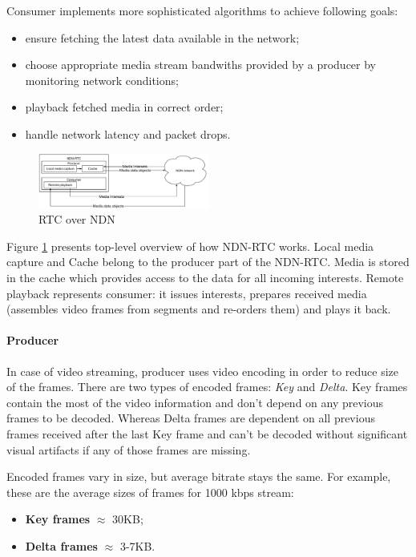 \documentclass[10pt]{proc}
\begin{document}
Consumer implements more sophisticated algorithms to achieve following goals:
\begin{itemize}
\item ensure fetching the latest data available in the network; 
\item choose appropriate media stream bandwiths provided by a producer by monitoring network conditions;
\item playback fetched media in correct order;
\item handle network latency and packet drops.
\end{itemize}

\begin{figure}[t!]
\centering
\includegraphics[width=0.5\textwidth]{architecture}
\caption{RTC over NDN}
\label{fig:arc}
\end{figure}

Figure \ref{fig:arc} presents top-level overview of how NDN-RTC works. Local media capture and Cache belong to the producer part of the NDN-RTC. Media is stored in the cache which provides access to the data for all incoming interests. Remote playback represents consumer: it issues interests, prepares received media (assembles video frames from segments and re-orders them) and plays it back.

\paragraph{Producer}

In case of video streaming, producer uses video encoding in order to reduce size of the frames. There are two types of encoded frames: \textit{Key} and \textit{Delta}. Key frames contain the most of the video information and don't depend on any previous frames to be decoded. Whereas Delta frames are dependent on all previous frames received after the last Key frame and can't be decoded without significant visual artifacts if any of those frames are missing.

Encoded frames vary in size, but average bitrate stays the same. For example, these are the average sizes of frames for 1000 kbps stream:
\begin{itemize}
\item \textbf{Key frames} $\approx$ 30KB;
\item \textbf{Delta frames} $\approx$ 3-7KB.
\end{itemize}
\end{document}
